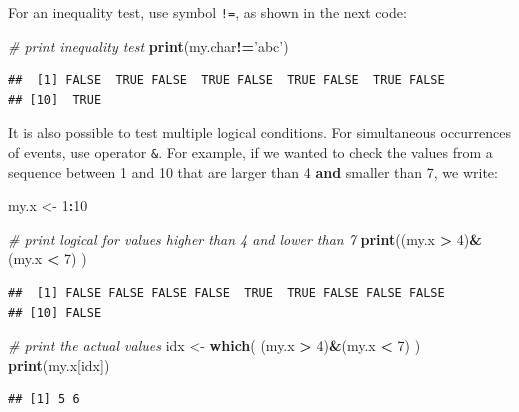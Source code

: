 \documentclass[11pt,]{book}
\newenvironment{Shaded}{\begin{snugshade}}{\end{snugshade}}
\newcommand{\KeywordTok}[1]{\textcolor[rgb]{0.27,0.27,0.27}{\textbf{#1}}}
\newcommand{\DecValTok}[1]{\textcolor[rgb]{0.06,0.06,0.06}{#1}}
\newcommand{\StringTok}[1]{\textcolor[rgb]{0.5,0.5,0.5}{#1}}
\newcommand{\CommentTok}[1]{\textcolor[rgb]{0.56,0.35,0.01}{\textit{#1}}}
\newcommand{\OperatorTok}[1]{\textcolor[rgb]{0.81,0.36,0.00}{\textbf{#1}}}
\newcommand{\NormalTok}[1]{#1}
\begin{document}
For an inequality test, use symbol \texttt{!=}, as shown in the next
code: 

\begin{Shaded}
\begin{Highlighting}[]
\CommentTok{# print inequality test}
\KeywordTok{print}\NormalTok{(my.char}\OperatorTok{!=}\StringTok{'abc'}\NormalTok{)}
\end{Highlighting}
\end{Shaded}

\begin{verbatim}
##  [1] FALSE  TRUE FALSE  TRUE FALSE  TRUE FALSE  TRUE FALSE
## [10]  TRUE
\end{verbatim}

It is also possible to test multiple logical conditions. For
simultaneous occurrences of events, use operator \texttt{\&}. For
example, if we wanted to check the values from a sequence between 1 and
10 that are larger than 4 \textbf{and} smaller than 7, we write:

\begin{Shaded}
\begin{Highlighting}[]
\NormalTok{my.x <-}\StringTok{ }\DecValTok{1}\OperatorTok{:}\DecValTok{10}

\CommentTok{# print logical for values higher than 4 and lower than 7}
\KeywordTok{print}\NormalTok{((my.x }\OperatorTok{>}\StringTok{ }\DecValTok{4}\NormalTok{)}\OperatorTok{&}\NormalTok{(my.x }\OperatorTok{<}\StringTok{ }\DecValTok{7}\NormalTok{) )}
\end{Highlighting}
\end{Shaded}

\begin{verbatim}
##  [1] FALSE FALSE FALSE FALSE  TRUE  TRUE FALSE FALSE FALSE
## [10] FALSE
\end{verbatim}

\begin{Shaded}
\begin{Highlighting}[]
\CommentTok{# print the actual values}
\NormalTok{idx <-}\StringTok{ }\KeywordTok{which}\NormalTok{( (my.x }\OperatorTok{>}\StringTok{ }\DecValTok{4}\NormalTok{)}\OperatorTok{&}\NormalTok{(my.x }\OperatorTok{<}\StringTok{ }\DecValTok{7}\NormalTok{) )}
\KeywordTok{print}\NormalTok{(my.x[idx])}
\end{Highlighting}
\end{Shaded}

\begin{verbatim}
## [1] 5 6
\end{verbatim}
\end{document}

